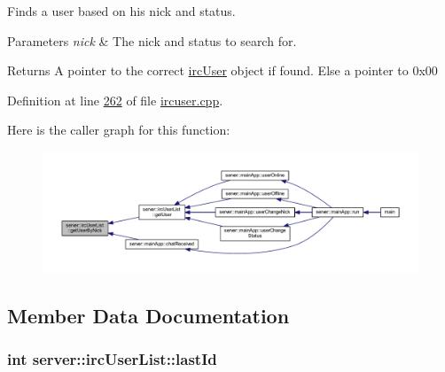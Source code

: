 Finds a user based on his nick and status. 


\begin{DoxyParams}{Parameters}
{\em nick} & The nick and status to search for. \\
\hline
\end{DoxyParams}
\begin{DoxyReturn}{Returns}
A pointer to the correct \hyperlink{classserver_1_1irc_user}{irc\-User} object if found. Else a pointer to 0x00 
\end{DoxyReturn}


Definition at line \hyperlink{custom_irc_server_2ircuser_8cpp_source_l00262}{262} of file \hyperlink{custom_irc_server_2ircuser_8cpp_source}{ircuser.\-cpp}.



Here is the caller graph for this function\-:
\nopagebreak
\begin{figure}[H]
\begin{center}
\leavevmode
\includegraphics[width=350pt]{d4/d08/classserver_1_1irc_user_list_a7f99e64e1cabde876fa6a827c6614a4e_icgraph}
\end{center}
\end{figure}




\subsection{Member Data Documentation}
\hypertarget{classserver_1_1irc_user_list_a1ed9d9889dcc65de41ed6988fc89bb13}{
\subsubsection[{last\-Id}]{\setlength{\rightskip}{0pt plus 5cm}int server\-::irc\-User\-List\-::last\-Id\hspace{0.3cm}{\ttfamily [private]}}}\label{d4/d08/classserver_1_1irc_user_list_a1ed9d9889dcc65de41ed6988fc89bb13}


